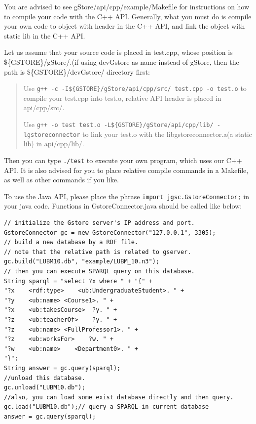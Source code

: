 \documentclass[titlepage, a4paper, 12pt]{article}
\begin{document}

You are advised to see gStore/api/cpp/example/Makefile for instructions on how to compile your code with the C++ API. Generally, what you must do is compile your own code to object with header in the C++ API, and link the object with static lib in the C++ API.

Let us assume that your source code is placed in test.cpp, whose position is \$\{GSTORE\}/gStore/.(if using devGstore as name instead of gStore, then the path is \$\{GSTORE\}/devGstore/ directory first:

\begin{quote}
Use \texttt{g++\ -c\ -I\$\{GSTORE\}/gStore/api/cpp/src/\ test.cpp\ -o\ test.o} to compile your test.cpp into test.o, relative API header is placed in api/cpp/src/.

Use \texttt{g++\ -o\ test\ test.o\ -L\$\{GSTORE\}/gStore/api/cpp/lib/\ -lgstoreconnector} to link your test.o with the libgstoreconnector.a(a static lib) in api/cpp/lib/.
\end{quote}

Then you can type \texttt{./test} to execute your own program, which uses our C++ API. It is also advised for you to place relative compile commands in a Makefile, as well as other commands if you like.



To use the Java API, please place the phrase
\texttt{import\ jgsc.GstoreConnector;} in your java code. Functions in
GstoreConnector.java should be called like below:

\begin{verbatim}
// initialize the Gstore server's IP address and port.
GstoreConnector gc = new GstoreConnector("127.0.0.1", 3305);
// build a new database by a RDF file.
// note that the relative path is related to gserver.
gc.build("LUBM10.db", "example/LUBM_10.n3");
// then you can execute SPARQL query on this database.
String sparql = "select ?x where " + "{" +
"?x    <rdf:type>    <ub:UndergraduateStudent>. " +
"?y    <ub:name> <Course1>. " +
"?x    <ub:takesCourse>  ?y. " +
"?z    <ub:teacherOf>    ?y. " +
"?z    <ub:name> <FullProfessor1>. " +
"?z    <ub:worksFor>    ?w. " +
"?w    <ub:name>    <Department0>. " +
"}";
String answer = gc.query(sparql);
//unload this database.
gc.unload("LUBM10.db");
//also, you can load some exist database directly and then query.
gc.load("LUBM10.db");// query a SPARQL in current database
answer = gc.query(sparql);
\end{verbatim}
\end{document}
